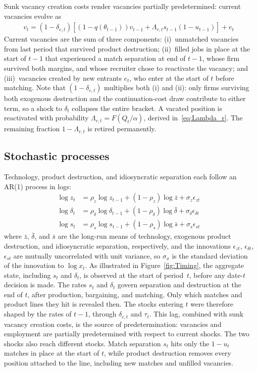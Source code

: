 \documentclass[authoryear, review, 12pt]{elsarticle}
\begin{document}
	Sunk vacancy creation costs render vacancies partially 
	predetermined: current vacancies evolve as
	\begin{align}
		v_{t}=(1-\delta_{e,t})[(1-q(\theta_{t-1}))v_{t-1}+
		\Lambda_{r,t}s_{t-1}(1-u_{t-1})]+e_{t}\label{eq:v_lom}
	\end{align}
	Current vacancies are the sum of three components: 
	(i)~unmatched vacancies from last period that survived product destruction; 
	(ii)~filled jobs in place at the start of $t-1$ that experienced a
	match separation at end of $t-1$, whose firm survived both margins,
	and whose recruiter chose to reactivate the vacancy; and (iii)~vacancies created by new
	entrants $e_t$, who enter at the start of $t$ before matching.
	Note that $(1-\delta_{e,t})$ multiplies both (i) and (ii):
	only firms surviving both exogenous destruction and the
	continuation-cost draw contribute to either term, so a shock
	to $\delta_t$ collapses the entire bracket. A vacated position is reactivated with
	probability $\Lambda_{r,t}=F(Q_t/\alpha)$, derived in~\eqref{eq:Lambda_r}. The remaining fraction $1-\Lambda_{r,t}$ is retired
	permanently.
	
	\subsection{Stochastic processes}
	
	Technology, product destruction, and idiosyncratic separation each 
	follow an AR(1) process in logs:
	\begin{align}
		\log z_t &= \rho_z \log z_{t-1} + (1-\rho_z)\log\bar{z} +
		\sigma_z\epsilon_{zt} \label{eq:ar1_z}\\
		\log \delta_t &= \rho_\delta \log \delta_{t-1} +
		(1-\rho_\delta)\log\bar{\delta} + \sigma_\delta\epsilon_{\delta t} \label{eq:ar1_delta}\\
		\log s_t &= \rho_s \log s_{t-1} +
		(1-\rho_s)\log\bar{s} + \sigma_s\epsilon_{st} \label{eq:ar1_s}
	\end{align}
	where $\bar{z}$, $\bar{\delta}$, and $\bar{s}$ are the long-run
	means of technology, exogenous product destruction, and
	idiosyncratic separation, respectively, and the innovations
	$\epsilon_{zt}$, $\epsilon_{\delta t}$, $\epsilon_{st}$ are mutually uncorrelated with unit
	variance, so $\sigma_x$ is the standard deviation of the innovation to $\log x_t$.
	As illustrated in Figure~\ref{fig:Timing}, the aggregate state,
	including $s_t$ and $\delta_t$, is observed at the start of
	period~$t$, before any date-$t$ decision is made. The rates
	$s_t$ and $\delta_t$ govern separation and destruction at the end
	of $t$, after production, bargaining, and matching. Only which
	matches and product lines they hit is revealed then. The stocks
	entering $t$ were therefore shaped by the rates of $t-1$, through
	$\delta_{e,t}$ and $\tau_t$. This lag, combined with sunk vacancy creation costs, is the
	source of predetermination: vacancies and employment are
	partially predetermined with respect to current shocks. The two shocks also reach
	different stocks. Match separation $s_t$ hits only the $1-u_t$ matches in place at the
	start of $t$, while product destruction removes every position attached to the line,
	including new matches and unfilled vacancies.
	
\end{document}
